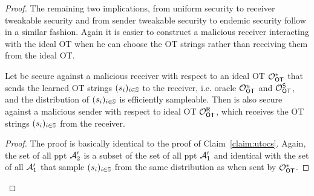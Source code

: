\begin{proof}
The remaining two implications, from uniform security to receiver tweakable security and from sender tweakable security to endemic security follow in a similar fashion. Again it is easier to construct a malicious receiver interacting with the ideal OT when he can choose the OT strings rather than receiving them from the ideal OT.
\begin{claim}\label{claim:utocr}
Let \OT be secure against a malicious receiver with respect to an ideal OT $\mathcal O_{\mathsf{OT}}^*$ that sends the learned OT strings $(s_i)_{i\in\mathsf{\mathbb S}}$ to the receiver, i.e. oracle $\mathcal O_{\mathsf{OT}}^u$ and $\mathcal O_{\mathsf{OT}}^{\mathsf{S}}$, and the distribution of $(s_i)_{i\in\mathsf{\mathbb S}}$ is efficiently sampleable. Then \OT is also secure against a malicious sender with respect to ideal OT $\mathcal O_{\mathsf{OT}}^{\mathsf{R}}$, which receives the OT strings $(s_i)_{i\in\mathsf{\mathbb S}}$ from the receiver.
\end{claim}

\begin{proof}
The proof is basically identical to the proof of Claim~\ref{claim:utocs}. Again, the set of all ppt $\mathcal{A}_2'$ is a subset of the set of all ppt $\mathcal{A}_1'$ and identical with the set of all $\mathcal{A}_1'$ that sample  $(s_i)_{i\in\mathsf{\mathbb S}}$ from the same distribution as when sent by $\mathcal O_{\mathsf{OT}}^*$.
\end{proof}

\end{proof}